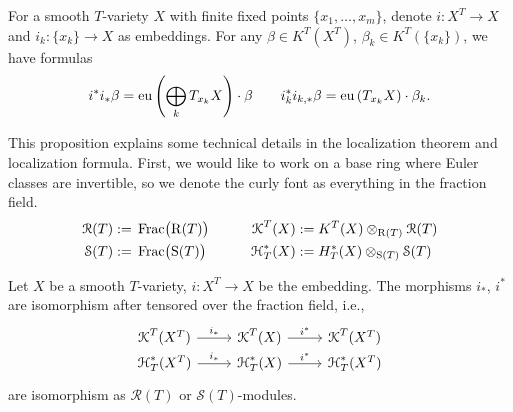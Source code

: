\begin{proposition}
For a smooth $T$-variety $X$ with finite fixed points $\{x_1,\ldots,x_m \}$, denote $i:X^T \longrightarrow X$ and $i_k: \{x_k\} \longrightarrow X$ as embeddings. For any $\beta \in K^T(X^T)$, $\beta_k \in K^T(\{x_k\})$, we have formulas
$$i^*i_* \beta =\operatorname{\operatorname{eu}} \left( \bigoplus_k T_{x_k}X \right) \cdot \beta \qquad i_{k}^*i_{k,*} \beta =\operatorname{\operatorname{eu}} \left( T_{x_k}X \right) \cdot \beta_k.$$


\end{proposition}

This proposition explains some technical details in the localization theorem and localization formula. First, we would like to work on a base ring where Euler classes are invertible, so we denote the curly font as everything in the fraction field.
\begin{equation*}
\begin{aligned}
  \operatorname{\operatorname{\mathcal{R}}}(T):=\;& \operatorname{\operatorname{Frac}}\!\big(\!\operatorname{\operatorname{R}}(T)\big) \qquad & \operatorname{\operatorname{\mathcal{K}}}^T(X):=\;& K^T(X) \otimes_{\operatorname{\operatorname{R}}(T)}\operatorname{\operatorname{\mathcal{R}}}(T)  \\ 
  \operatorname{\operatorname{\mathcal{S}}}(T):=\;& \operatorname{\operatorname{Frac}}\!\big(\!\operatorname{\operatorname{S}}(T)\big) \qquad & \operatorname{\operatorname{\mathcal{H}}}_{T}^{*}(X):=\;& H_{T}^{*}(X) \otimes_{\operatorname{\operatorname{S}}(T)}\operatorname{\operatorname{\mathcal{S}}}(T)  \\
\end{aligned}
\end{equation*}


\begin{theorem} \label{thm:localization_theorem}
Let $X$ be a smooth $T$-variety,  $i:X^T \longrightarrow X$ be the embedding. The morphisms $i_*$, $i^*$ are isomorphism after tensored over the fraction field, i.e.,
\[\begin{tikzcd}[row sep=0mm]
	{\Kcurl^T(X^T)} & {\Kcurl^T(X)} & {\Kcurl^T(X^T)} \\
	{\Hcurl_{T}^{*}(X^T)} & {\Hcurl_{T}^{*}(X)} & {\Hcurl_{T}^{*}(X^T)}
	\arrow["{i^*}", from=1-2, to=1-3]
	\arrow["{i_*}", from=2-1, to=2-2]
	\arrow["{i^*}", from=2-2, to=2-3]
	\arrow["{i_*}", from=1-1, to=1-2]
\end{tikzcd}\]
are isomorphism as $\mathcal{R}(T)$ or $\mathcal{S}(T)$-modules.
\end{theorem}


